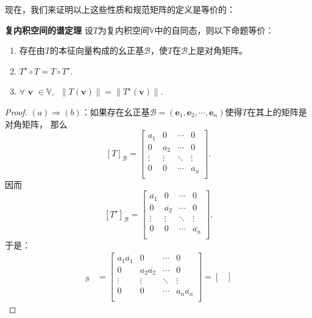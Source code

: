 \documentclass[12pt,UTF8,fontset=none]{ctexbook}
\begin{document}
现在，我们来证明以上这些性质和规范矩阵的定义是等价的：
\begin{pp}\textbf{复内积空间的谱定理 }\label{pp:8_9}
    设$T$为复内积空间$\mathbb{V}$中的自同态，则以下命题等价：
    \begin{enumerate}[label=\alph*.]   
        \item 存在由$T$的本征向量构成的幺正基$\mathcal{B}$，使$T$在$\mathcal{B}$上是对角矩阵。
        \item $T^\star\circ T = T\circ T^\star.$
        \item $\forall \,\, \mathbf{v} \,\, \in \mathbb{V}, \,\,\, \| T(\mathbf{v})\| = \| T^\star(\mathbf{v})\|.$
    \end{enumerate}
\end{pp}
\begin{proof} %
    $(a)\Rightarrow (b)$：如果存在幺正基$\mathcal{B} = (\mathbf{e}_1, \mathbf{e}_2, \cdots , \mathbf{e}_n)$使得$T$在其上的矩阵是对角矩阵，
    那么
    $$[T]_{\mathcal{B}} = \begin{bmatrix}
        a_1 & 0 & \cdots & 0 \\
        0 & a_2 & \cdots & 0 \\
        \vdots & \vdots & \ddots & \vdots \\
        0 & 0 & \cdots & a_n \\
    \end{bmatrix}.
    $$
    因而
    $$[T^\star]_{\mathcal{B}} = \begin{bmatrix}
        \overline{a_1} & 0 & \cdots & 0 \\
        0 & \overline{a_2} & \cdots & 0 \\
        \vdots & \vdots & \ddots & \vdots \\
        0 & 0 & \cdots & \overline{a_n} \\
    \end{bmatrix}.
    $$
    于是：
    \begin{align*}
        [T\circ T^\star]_{\mathcal{B}} &= \begin{bmatrix}
            a_1\overline{a_1} & 0 & \cdots & 0 \\
            0 & a_2\overline{a_2} & \cdots & 0 \\
            \vdots & \vdots & \ddots & \vdots \\
            0 & 0 & \cdots & a_n\overline{a_n} \\
        \end{bmatrix} = \begin{bmatrix}

\end{bmatrix}
\end{align*}
\end{proof}
\end{document}
